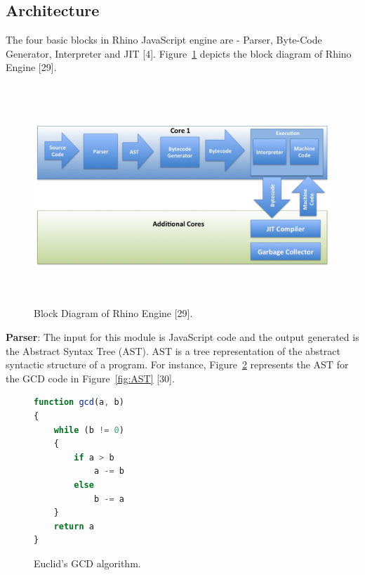 \subsection{Architecture}
The four basic blocks in Rhino JavaScript engine are - Parser, Byte-Code Generator, Interpreter and JIT [4]. Figure~\ref{fig:architecture} depicts the block diagram of Rhino Engine [29].

\begin{figure}
  \centering
      \includegraphics[width=15cm, height=8.25cm]{rhino.jpg}
    \caption[Block Diagram of Rhino Engine]{Block Diagram of Rhino Engine [29].}
    \label{fig:architecture}
\end{figure}

\textbf{Parser}: The input for this module is JavaScript code and the output generated is the Abstract Syntax Tree (AST). AST is a tree representation of the abstract syntactic structure of a program. For instance, Figure~\ref{fig:ASTcode} represents the AST for the GCD code in Figure~\ref{fig:AST} [30].

\begin{figure}
  \centering
\begin{lstlisting}[language=JavaScript] 
function gcd(a, b)
{
	while (b != 0)
    {
    	if a > b
        	a -= b
        else
        	b -= a
    }
    return a
}
\end{lstlisting}
    \caption[Euclid's GCD algorithm]{Euclid's GCD algorithm.}
    \label{fig:ASTcode}
\end{figure}


